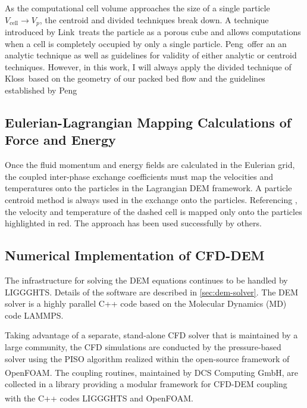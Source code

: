 As the computational cell volume approaches the size of a single particle $V_\text{cell}\rightarrow V_p$, the centroid and divided techniques break down. A technique introduced by Link\etal~treats the particle as a porous cube and allows computations when a cell is completely occupied by only a single particle.\cite{Link2005} Peng\etal~offer an an analytic technique as well as guidelines for validity of either analytic or centroid techniques.\cite{Peng2014} However, in this work, I will always apply the divided technique of Kloss\etal~based on the geometry of our packed bed flow and the guidelines established by Peng\etal\cite{Kloss2012,Peng2014}


\subsection{Eulerian-Lagrangian Mapping Calculations of Force and Energy}
Once the fluid momentum and energy fields are calculated in the Eulerian grid, the coupled inter-phase exchange coefficients must map the velocities and temperatures onto the particles in the Lagrangian DEM framework. A particle centroid method is always used in the exchange onto the particles. Referencing , the velocity and temperature of the dashed cell is mapped only onto the particles highlighted in red. The approach has been used successfully by others.\cite{Xu1997,Link2005,Kloss2012}



\subsection{Numerical Implementation of CFD-DEM}\label{sec:cfd-dem-solver}

The infrastructure for solving the DEM equations continues to be handled by LIGGGHTS. Details of the software are described in \cref{sec:dem-solver}. The DEM solver is a highly parallel C++ code based on the Molecular Dynamics (MD) code LAMMPS.\cite{Plimpton1995}

Taking advantage of a separate, stand-alone CFD solver that is maintained by a large community, the CFD simulations are conducted by the pressure-based solver using the PISO algorithm realized within the open-source framework of OpenFOAM\textsuperscript{\textregistered}.\cite{Issa1986,OpenCFDLtd2014} The coupling routines, maintained by DCS Computing GmbH, are collected in a library providing a modular framework for CFD-DEM coupling with the C++ codes LIGGGHTS and OpenFOAM\textsuperscript{\textregistered}.\cite{Kloss2012,Goniva2012}

